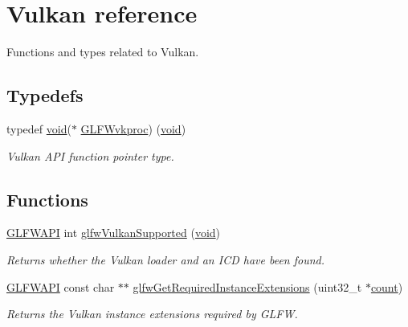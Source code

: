 \hypertarget{group__vulkan}{}\section{Vulkan reference}
\label{group__vulkan}


Functions and types related to Vulkan.  


\subsection*{Typedefs}
\begin{DoxyCompactItemize}
\item 
typedef \mbox{\hyperlink{glad_8h_a950fc91edb4504f62f1c577bf4727c29}{void}}($\ast$ \mbox{\hyperlink{group__vulkan_ga70c01918dc9d233a4fbe0681a43018af}{G\+L\+F\+Wvkproc}}) (\mbox{\hyperlink{glad_8h_a950fc91edb4504f62f1c577bf4727c29}{void}})
\begin{DoxyCompactList}\small\item\em Vulkan A\+PI function pointer type. \end{DoxyCompactList}\end{DoxyCompactItemize}
\subsection*{Functions}
\begin{DoxyCompactItemize}
\item 
\mbox{\hyperlink{glfw3_8h_a56da5036b2cc259351ae22fd6439bb47}{G\+L\+F\+W\+A\+PI}} int \mbox{\hyperlink{group__vulkan_ga72e7c3757d9ff2333181a5569bb7c403}{glfw\+Vulkan\+Supported}} (\mbox{\hyperlink{glad_8h_a950fc91edb4504f62f1c577bf4727c29}{void}})
\begin{DoxyCompactList}\small\item\em Returns whether the Vulkan loader and an I\+CD have been found. \end{DoxyCompactList}\item 
\mbox{\hyperlink{glfw3_8h_a56da5036b2cc259351ae22fd6439bb47}{G\+L\+F\+W\+A\+PI}} const char $\ast$$\ast$ \mbox{\hyperlink{group__vulkan_ga70adaf0cfc99adc484c49ea99e17c2cf}{glfw\+Get\+Required\+Instance\+Extensions}} (uint32\+\_\+t $\ast$\mbox{\hyperlink{glad_8h_a83e2dd3e98558b907ab7fb03cee26bda}{count}})
\begin{DoxyCompactList}\small\item\em Returns the Vulkan instance extensions required by G\+L\+FW. \end{DoxyCompactList}\end{DoxyCompactItemize}


